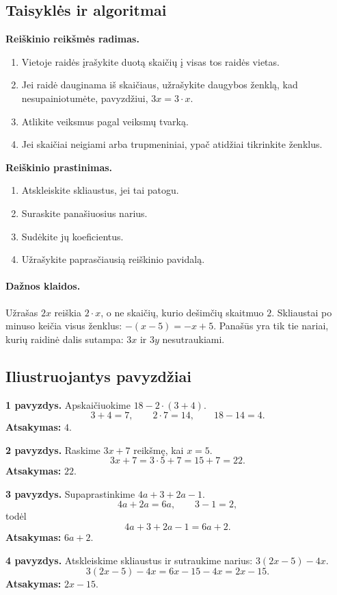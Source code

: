 \subsection{Taisyklės ir algoritmai}
\textbf{Reiškinio reikšmės radimas.}
\begin{enumerate}[label=\arabic*.]
\item Vietoje raidės įrašykite duotą skaičių į visas tos raidės vietas.
\item Jei raidė dauginama iš skaičiaus, užrašykite daugybos ženklą, kad nesupainiotumėte, pavyzdžiui, \(3x=3\cdot x\).
\item Atlikite veiksmus pagal veiksmų tvarką.
\item Jei skaičiai neigiami arba trupmeniniai, ypač atidžiai tikrinkite ženklus.
\end{enumerate}

\textbf{Reiškinio prastinimas.}
\begin{enumerate}[label=\arabic*.]
\item Atskleiskite skliaustus, jei tai patogu.
\item Suraskite panašiuosius narius.
\item Sudėkite jų koeficientus.
\item Užrašykite paprasčiausią reiškinio pavidalą.
\end{enumerate}

\paragraph{Dažnos klaidos.}
Užrašas \(2x\) reiškia \(2\cdot x\), o ne skaičių, kurio dešimčių skaitmuo \(2\). Skliaustai po minuso keičia visus ženklus: \(-(x-5)=-x+5\). Panašūs yra tik tie nariai, kurių raidinė dalis sutampa: \(3x\) ir \(3y\) nesutraukiami.

\subsection{Iliustruojantys pavyzdžiai}
\textbf{1 pavyzdys.} Apskaičiuokime \(18-2\cdot(3+4)\).
\[
3+4=7,\qquad 2\cdot 7=14,\qquad 18-14=4.
\]
\textbf{Atsakymas:} \(4\).

\textbf{2 pavyzdys.} Raskime \(3x+7\) reikšmę, kai \(x=5\).
\[
3x+7=3\cdot 5+7=15+7=22.
\]
\textbf{Atsakymas:} \(22\).

\textbf{3 pavyzdys.} Supaprastinkime \(4a+3+2a-1\).
\[
4a+2a=6a,\qquad 3-1=2,
\]
todėl
\[
4a+3+2a-1=6a+2.
\]
\textbf{Atsakymas:} \(6a+2\).

\textbf{4 pavyzdys.} Atskleiskime skliaustus ir sutraukime narius: \(3(2x-5)-4x\).
\[
3(2x-5)-4x=6x-15-4x=2x-15.
\]
\textbf{Atsakymas:} \(2x-15\).

